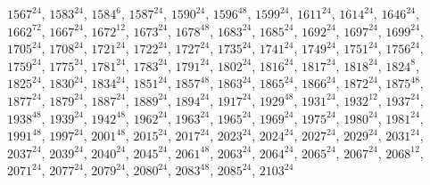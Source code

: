 \begin{itemize}
$1567^{24}$, $1583^{24}$, $1584^{6}$, $1587^{24}$, $1590^{24}$, $1596^{48}$, $1599^{24}$, $1611^{24}$, $1614^{24}$, $1646^{24}$, $1662^{72}$, $1667^{24}$, $1672^{12}$, $1673^{24}$, $1678^{48}$, $1683^{24}$, $1685^{24}$, $1692^{24}$, $1697^{24}$, $1699^{24}$, $1705^{24}$, $1708^{24}$, $1721^{24}$, $1722^{24}$, $1727^{24}$, $1735^{24}$, $1741^{24}$, $1749^{24}$, $1751^{24}$, $1756^{24}$, $1759^{24}$, $1775^{24}$, $1781^{24}$, $1783^{24}$, $1791^{24}$, $1802^{24}$, $1816^{24}$, $1817^{24}$, $1818^{24}$, $1824^{8}$, $1825^{24}$, $1830^{24}$, $1834^{24}$, $1851^{24}$, $1857^{48}$, $1863^{24}$, $1865^{24}$, $1866^{24}$, $1872^{24}$, $1875^{48}$, $1877^{24}$, $1879^{24}$, $1887^{24}$, $1889^{24}$, $1894^{24}$, $1917^{24}$, $1929^{48}$, $1931^{24}$, $1932^{12}$, $1937^{24}$, $1938^{48}$, $1939^{24}$, $1942^{48}$, $1962^{24}$, $1963^{24}$, $1965^{24}$, $1969^{24}$, $1975^{24}$, $1980^{24}$, $1981^{24}$, $1991^{48}$, $1997^{24}$, $2001^{48}$, $2015^{24}$, $2017^{24}$, $2023^{24}$, $2024^{24}$, $2027^{24}$, $2029^{24}$, $2031^{24}$, $2037^{24}$, $2039^{24}$, $2040^{24}$, $2045^{24}$, $2061^{48}$, $2063^{24}$, $2064^{24}$, $2065^{24}$, $2067^{24}$, $2068^{12}$, $2071^{24}$, $2077^{24}$, $2079^{24}$, $2080^{24}$, $2083^{48}$, $2085^{24}$, $2103^{24}$

\end{itemize}
